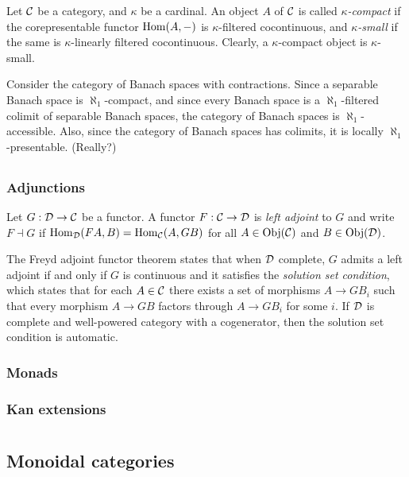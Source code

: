 \documentclass{../../large}
\begin{document}
Let $\mathcal{C}$ be a category, and $\kappa$ be a cardinal.
An object $A$ of $\mathcal{C}$ is called \emph{$\kappa$-compact} if the corepresentable functor $\operatorname{Hom}(A,-)$ is $\kappa$-filtered cocontinuous, and \emph{$\kappa$-small} if the same is $\kappa$-linearly filtered cocontinuous.
Clearly, a $\kappa$-compact object is $\kappa$-small.



Consider the category of Banach spaces with contractions.
Since a separable Banach space is $\aleph_1$-compact, and since every Banach space is a $\aleph_1$-filtered colimit of separable Banach spaces, the category of Banach spaces is $\aleph_1$-accessible.
Also, since the category of Banach spaces has colimits, it is locally $\aleph_1$-presentable.
(Really?)


\chapter{}
\section{Adjunctions}


Let $G:\mathcal{D}\to\mathcal{C}$ be a functor.
A functor $F:\mathcal{C}\to\mathcal{D}$ is \emph{left adjoint} to $G$ and write $F\dashv G$ if $\operatorname{Hom}_{\mathcal{D}}(FA,B)=\operatorname{Hom}_{\mathcal{C}}(A,GB)$ for all $A\in\operatorname{Obj}(\mathcal{C})$ and $B\in\operatorname{Obj}(\mathcal{D})$.

The Freyd adjoint functor theorem states that when $\mathcal{D}$ complete, $G$ admits a left adjoint if and only if $G$ is continuous and it satisfies the \emph{solution set condition}, which states that for each $A\in\mathcal{C}$ there exists a set of morphisms $A\to GB_i$ such that every morphism $A\to GB$ factors through $A\to GB_i$ for some $i$.
If $\mathcal{D}$ is complete and well-powered category with a cogenerator, then the solution set condition is automatic.

\section{Monads}

\section{Kan extensions}


\part{}


\chapter{Monoidal categories}
\end{document}
